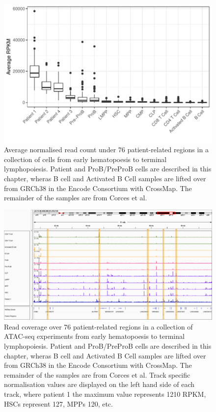 \begin{figure}
    \centering
    \includegraphics[width=\textwidth]{plot/ch5/patients_versus_corces_reads.pdf}
    \caption{Average normalised read count under 76 patient-related regions in a collection of cells from early hematopoesis to terminal lymphopoiesis. Patient and ProB/PreProB cells are described in this chapter, wheras B cell and Activated B Cell samples are lifted over from GRCh38 in the Encode Consortium with CrossMap. The remainder of the samples are from Corces et al.}
\end{figure}


\begin{figure}
    \centering
    \includegraphics[width=\textwidth]{plot/ch5/lymph_enhancer_cluster.pdf}
    \caption{Read coverage over 76 patient-related regions in a collection of ATAC-seq experiments from early hematopoesis to terminal lymphopoiesis. Patient and ProB/PreProB cells are described in this chapter, wheras B cell and Activated B Cell samples are lifted over from GRCh38 in the Encode Consortium with CrossMap. The remainder of the samples are from Corces et al. Track specific normalisation values are displayed on the left hand side of each track, where patient 1 the maximum value represents 1210 RPKM, HSCs represent 127, MPPs 120, etc. }
    \label{fig:lymph_enhancer_cluster}
\end{figure}


